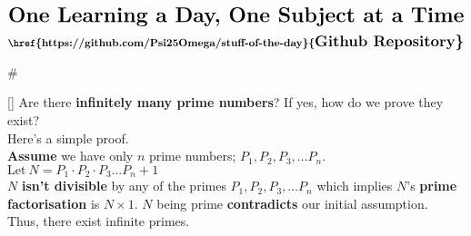 \documentclass{article}
\begin{document}
\sffamily
\newenvironment{mathbox}[1][2]
{
  \vspace{1em}
  \begin{tcolorbox}[colback=yellow!50!white, colframe=yellow!60!red, title=#1]
  #
}
{
  \end{tcolorbox}
}
\newenvironment{phybox}[1][2]
{
  \vspace{1em}
  \begin{tcolorbox}[colback=blue!30!white, colframe=blue!80!white, title=#1]
  #
}
{
  \end{tcolorbox}
}
\newenvironment{chembox}[1][2]
{
  \vspace{1em}
  \begin{tcolorbox}[colback=red!30!white, colframe=red!90!white, title=#1]
  #
}
{
  \end{tcolorbox}
}
\newenvironment{biobox}[1][2]
{
  \vspace{1em}
  \begin{tcolorbox}[colback=green!30!white, colframe=ForestGreen!85!green, title=#1]
  #
}
{
  \end{tcolorbox}
}
\sffamily
\begin{align*}
    \LARGE\textbf{One Learning a Day, One Subject at a Time}
\end{align*}
\begin{align*}
\textbf{\href{https://github.com/Psi25Omega/stuff-of-the-day}{\Large{Github Repository}}}
\end{align*}
\begin{mathbox}
[]
Are there \textbf{infinitely many prime numbers}? If yes, how do we prove they exist?\\
Here's a simple proof.\\
\textbf{Assume} we have only $n$ prime numbers; $P_1, P_2, P_3, \dots P_n$.\\
$\text{Let}~N = P_1 \cdot P_2 \cdot P_3 \dots P_n + 1$\\
$N$ \textbf{isn't divisible} by any of the primes $P_1, P_2, P_3, \dots P_n$  which implies $N$'s \textbf{prime factorisation} is $N \times 1$. $N$ being prime \textbf{contradicts} our initial assumption.\\
Thus, there exist infinite primes.
\end{mathbox}
\end{document}
